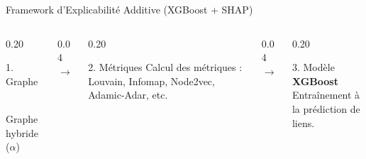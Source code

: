 \documentclass[10pt]{beamer}
\begin{document}
\begin{frame}{Framework d'Explicabilité Additive (XGBoost + SHAP)}

    \begin{columns}[c] %
        
        \begin{column}{0.20\textwidth}
            \begin{block}{\centering \scriptsize 1. Graphe}
                \centering \vspace{0.1cm}
                 \\
                \tiny Graphe hybride ($\alpha$)
            \end{block}
        \end{column}
        
        \begin{column}{0.04\textwidth}
            \centering $\rightarrow$
        \end{column}

        \begin{column}{0.20\textwidth}
            \begin{block}{\centering \scriptsize 2. Métriques}
                \scriptsize \centering \vspace{0.1cm}
                Calcul des métriques : Louvain, Infomap, Node2vec, Adamic-Adar, etc.
                \vspace{0.25cm}
            \end{block}
        \end{column}

        \begin{column}{0.04\textwidth}
            \centering $\rightarrow$
        \end{column}

        \begin{column}{0.20\textwidth}
            \begin{exampleblock}{\centering \scriptsize 3. Modèle}
                \scriptsize \centering \vspace{0.1cm}
                \textbf{XGBoost} \\
                Entraînement à la prédiction de liens.
            \end{exampleblock}
        \end{column}


\end{columns}
\end{frame}
\end{document}
